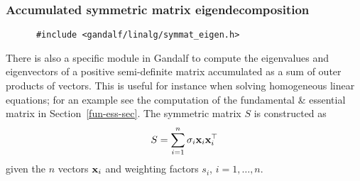 \subsubsection{Accumulated symmetric matrix eigendecomposition}
\label{acc-symeigen-sec}
\begin{verbatim}
      #include <gandalf/linalg/symmat_eigen.h>
\end{verbatim}
There is also a specific module in Gandalf to compute the eigenvalues and
eigenvectors of a positive semi-definite matrix accumulated as a sum of
outer products of vectors. This is useful for instance when solving
homogeneous linear equations; for an example see the computation of the
fundamental \& essential matrix in Section~\ref{fun-ess-sec}.
The symmetric matrix $S$ is constructed as
\begin{equation}
 S = \sum_{i=1}^n \sigma_i {\bf x}_i {\bf x}_i^{\top}
 \label{acc-eigen-sum}
\end{equation}
given the $n$ vectors ${\bf x}_i$ and weighting factors $s_i$, $i=1,\ldots,n$.

